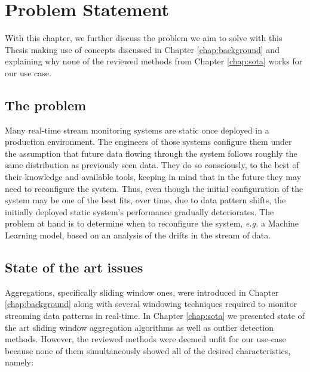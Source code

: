\chapter{Problem Statement} \label{chap:statement} \minitoc

With this chapter, we further discuss the problem we aim to solve with this Thesis making use of concepts discussed in Chapter \ref{chap:background} and explaining why none of the reviewed methods from Chapter \ref{chap:sota} works for our use case.

\section{The problem}
Many real-time stream monitoring systems are static once deployed in a production environment. The engineers of those systems configure them under the assumption that future data flowing through the system follows roughly the same distribution as previously seen data. They do so consciously, to the best of their knowledge and available tools, keeping in mind that in the future they may need to reconfigure the system. Thus, even though the initial configuration of the system may be one of the best fits, over time, due to data pattern shifts, the initially deployed static system's performance gradually deteriorates. The problem at hand is to determine when to reconfigure the system, \textit{e.g.} a Machine Learning model, based on an analysis of the drifts in the stream of data.

\section{State of the art issues}
Aggregations, specifically sliding window ones, were introduced in Chapter \ref{chap:background} along with several windowing techniques required to monitor streaming data patterns in real-time. In Chapter \ref{chap:sota} we presented state of the art sliding window aggregation algorithms as well as outlier detection methods. However, the reviewed methods were deemed unfit for our use-case because none of them simultaneously showed all of the desired characteristics, namely:

